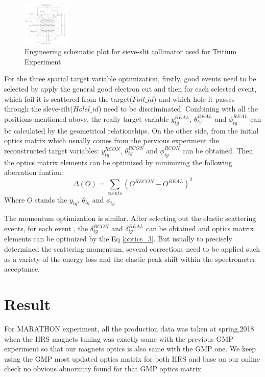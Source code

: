 \begin{figure}
 	\begin{center}
 		\includegraphics[width=0.2\textwidth] {./optics_plot/optics_1.png}
 		\caption{Engineering schematic plot for sieve-slit collimator used for Tritium Experiment } \label{optics_plt3}
 	\end{center}
\end{figure}   
For the three spatial target variable optimization, firstly, good events need to be selected by apply the general good electron cut and then for each selected event, which foil it is scattered from the target($Foil\_id$) and which hole it passes through the 
sleve-silt($Holel\_id$) need to be discriminated. Combining with all the positions mentioned above, the really target variable $y_{tg}^{REAL}$, $\theta_{tg}^{REAL}$ and $\phi_{tg}^{REAL}$ can be calculated by the geometrical relationships. On the other side, from the initial optics matrix which usually comes from the pervious experiment the reconstructed target variables: $y_{tg}^{RCON}$, $\theta_{tg}^{RCON}$ and $\phi_{tg}^{RCON}$ can be obtained. Then the optics matrix elements can be optimized by minimizing the following aberration funtion:
\begin{equation}  
\Delta(O)=\sum_{events}\left( O^{RECON}-O^{REAL}\right) ^{2}
\end{equation} \label{optics_3}  
Where $O$ stands the $y_{tg}$, $\theta_{tg}$ and $\phi_{tg}$ 

The momentum optimization is similar. After selecting out the elastic scattering events, for each event , the $\delta_{tg}^{RCON}$ and $\delta_{tg}^{REAL}$ can be obtained and optics matrix elements can be optimized by the Eq \ref{optics_3}. But usually to precisely determined the scattering momentum, several corrections need to be applied such as a variety of the energy loss and the elastic peak shift within the spectrometer acceptance. 


\section{Result}
For MARATHON experiment, all the production data was taken at spring,2018  when the HRS magnets tuning was exactly same with the previous GMP experiment so that our magnets optics is also same with the GMP one.  We keep using the GMP most updated optics matrix for both HRS and base on our online check no obvious abnormity found for that GMP optics matrix

